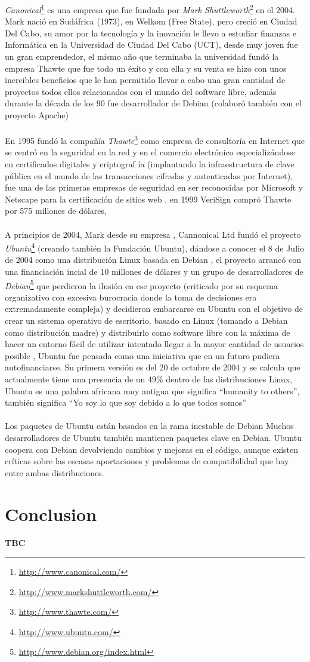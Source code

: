 \documentclass[a4paper,oneside,11pt]{article}
\begin{document}
\emph{Canonical}\footnote{\url{http://www.canonical.com/}} es una empresa que fue fundada por \emph{Mark Shuttleworth}\footnote{\url{http://www.markshuttleworth.com/}} en el 2004. Mark naci\'o en Sud\'africa (1973), en Welkom (Free State), pero creci\'o en Ciudad
Del Cabo, su amor por la tecnolog\'ia y la inovaci\'on le llevo a estudiar finanzas e Inform\'atica en
la Universidad de Ciudad Del Cabo (UCT), desde muy joven fue un gran emprendedor, el mismo
año que terminaba la universidad fund\'o la empresa Thawte que fue todo un \'exito y con ella y su
venta se hizo con unos increibles beneficios que le han permitido llevar a cabo una gran cantidad de
proyectos todos ellos relacionados con el mundo del software libre, adem\'as durante la d\'ecada de los
90 fue desarrollador de Debian (colabor\'o tambi\'en con el proyecto Apache)
\\\\
En 1995 fund\'o la compañ\'ia \emph{Thawte}\footnote{\url{http://www.thawte.com/}} como empresa de consultor\'ia en Internet que se centr\'o en
la seguridad en la red y en el comercio electr\'onico especializ\'andose en certificados digitales y criptograf
\'ia (implantando la infraestructura de clave p\'ublica en el mundo de las transacciones cifradas
y autenticadas por Internet), fue una de las primeras empresas de seguridad en ser reconocidas por
Microsoft y Netscape para la certificaci\'on de sitios web , en 1999 VeriSign compr\'o Thawte por 575
millones de d\'olares,
\\\\
A principios de 2004, Mark desde su empresa , Cannonical Ltd fund\'o el proyecto \emph{Ubuntu}\footnote{\url{http://www.ubuntu.com/}} (creando
tambi\'en la Fundaci\'on Ubuntu), d\'andose a conocer el 8 de Julio de 2004 como una distribuci\'on
Linux basada en Debian , el proyecto arranc\'o con una financiaci\'on incial de 10 millones de d\'olares
y un grupo de desarrolladores de \emph{Debian}\footnote{\url{http://www.debian.org/index.html}} que perdieron la ilusi\'on en ese proyecto (criticado por
su esquema organizativo con excesiva burocracia donde la toma de decisiones era extremadamente
compleja) y decidieron embarcarse en Ubuntu con el objetivo de crear un sistema operativo
de escritorio. basado en Linux (tomando a Debian como distribuci\'on madre) y distribuirlo como
software libre con la m\'axima de hacer un entorno f\'acil de utilizar intentado llegar a la mayor
cantidad de usuarios posible , Ubuntu fue pensada como una iniciativa que en un futuro pudiera
autofinanciarse.
Su primera versi\'on es del 20 de octubre de 2004 y se calcula que actualmente tiene una presencia
de un 49\% dentro de las distribuciones Linux, Ubuntu es una palabra africana muy antigua
que significa ``humanity to others'', tambi\'en significa ``Yo soy lo que soy debido a lo que todos
somos''
\\\\
Los paquetes de Ubuntu est\'an basados en la rama inestable de Debian Muchos desarrolladores
de Ubuntu tambi\'en mantienen paquetes clave en Debian. Ubuntu coopera con Debian devolviendo
cambios y mejoras en el c\'odigo, aunque existen cr\'iticas sobre las escasas aportaciones y problemas
de compatibilidad que hay entre ambas distribuciones.

\section{Conclusion}

\textbf{TBC}
\end{document}
